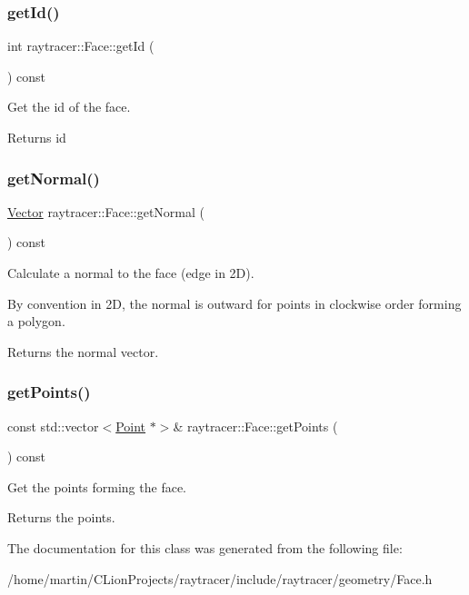 \subsubsection{\texorpdfstring{get\+Id()}{getId()}}
{\footnotesize\ttfamily int raytracer\+::\+Face\+::get\+Id (\begin{DoxyParamCaption}{ }\end{DoxyParamCaption}) const}



Get the id of the face. 

\begin{DoxyReturn}{Returns}
id 
\end{DoxyReturn}
\mbox{\label{classraytracer_1_1Face_a4b7079a236be6c724a160250eccf3bac}} 
\subsubsection{\texorpdfstring{get\+Normal()}{getNormal()}}
{\footnotesize\ttfamily \hyperlink{classraytracer_1_1Vector}{Vector} raytracer\+::\+Face\+::get\+Normal (\begin{DoxyParamCaption}{ }\end{DoxyParamCaption}) const}



Calculate a normal to the face (edge in 2D). 

By convention in 2D, the normal is outward for points in clockwise order forming a polygon. \begin{DoxyReturn}{Returns}
the normal vector. 
\end{DoxyReturn}
\mbox{\label{classraytracer_1_1Face_a54b2f1c95ee3d187ca286e7519450af0}} 
\subsubsection{\texorpdfstring{get\+Points()}{getPoints()}}
{\footnotesize\ttfamily const std\+::vector$<$\hyperlink{classraytracer_1_1Point}{Point} $\ast$$>$\& raytracer\+::\+Face\+::get\+Points (\begin{DoxyParamCaption}{ }\end{DoxyParamCaption}) const}



Get the points forming the face. 

\begin{DoxyReturn}{Returns}
the points. 
\end{DoxyReturn}


The documentation for this class was generated from the following file\+:\begin{DoxyCompactItemize}
\item 
/home/martin/\+C\+Lion\+Projects/raytracer/include/raytracer/geometry/Face.\+h\end{DoxyCompactItemize}

